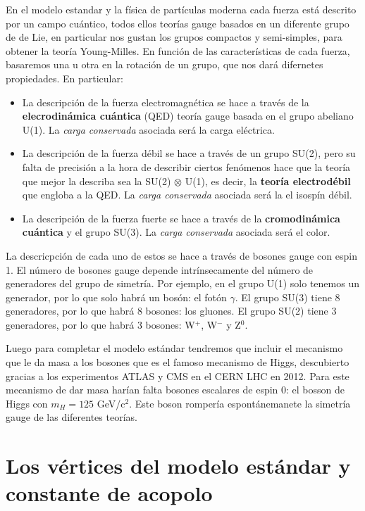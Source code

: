 En el modelo estandar y la física de partículas moderna cada fuerza está descrito por un campo cuántico, todos ellos teorías gauge basados en un diferente grupo de de Lie, en particular nos gustan los grupos compactos y semi-simples, para obtener la teoría Young-Milles. En función de las características de cada fuerza, basaremos una u otra en la rotación de un grupo, que nos dará difernetes propiedades. En particular:

\begin{itemize}
	\item La descripción de la fuerza electromagnética se hace a través de la \textbf{elecrodinámica cuántica} (QED) teoría gauge basada en el grupo abeliano U(1). La \textit{carga conservada} asociada será la carga eléctrica.
	\item La descripción de la fuerza débil se hace a través de un grupo SU(2), pero su falta de precisión a la hora de describir ciertos fenómenos hace que la teoría que mejor la describa sea la SU(2) $\otimes$ U(1), es decir, la \textbf{teoría electrodébil} que engloba a la QED. La \textit{carga conservada} asociada será la el isospín débil.
	\item La descripción de la fuerza fuerte se hace a través de la \textbf{cromodinámica cuántica} y el grupo SU(3). La \textit{carga conservada} asociada será el color.
\end{itemize}
La descricpción de cada uno de estos se hace a través de bosones gauge con espin 1. El número de bosones gauge depende intrínsecamente del número de generadores del grupo de simetría. Por ejemplo, en el grupo U(1) solo tenemos un generador, por lo que solo habrá un bosón: el fotón $\gamma$. El grupo SU(3) tiene 8 generadores, por lo que habrá 8 bosones: los gluones. El grupo SU(2) tiene 3 generadores, por lo que habrá 3 bosones: W$^+$, W$^-$ y Z$^0$.

Luego para completar el modelo estándar tendremos que incluir el mecanismo que le da masa a los bosones que es el famoso mecanismo de Higgs, descubierto gracias a los experimentos ATLAS y CMS en el CERN LHC en 2012. Para este mecanismo de dar masa harían falta bosones escalares de espin 0: el bosson de Higgs con $m_H=125$ GeV/c$^2$. Este boson rompería espontánemanete la simetría gauge de las diferentes teorías.

\section{Los vértices del modelo estándar y constante de acopolo}

